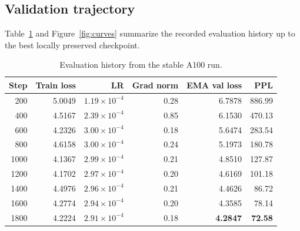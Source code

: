 \documentclass[11pt]{article}
\begin{document}
\subsection{Validation trajectory}
Table~\ref{tab:eval-history} and Figure~\ref{fig:curves} summarize the recorded evaluation history up to the best locally preserved checkpoint.

\begin{table}[t]
    \centering
    \caption{Evaluation history from the stable A100 run.}
    \label{tab:eval-history}
    \begin{tabular}{@{}r r r r r r@{}}
        \toprule
        Step & Train loss & LR & Grad norm & EMA val loss & PPL \\
        \midrule
         200 & 5.0049 & $1.19{\times}10^{-4}$ & 0.28 & 6.7878 & 886.99 \\
         400 & 4.5167 & $2.39{\times}10^{-4}$ & 0.85 & 6.1530 & 470.13 \\
         600 & 4.2326 & $3.00{\times}10^{-4}$ & 0.18 & 5.6474 & 283.54 \\
         800 & 4.6158 & $3.00{\times}10^{-4}$ & 0.24 & 5.1973 & 180.78 \\
        1000 & 4.1367 & $2.99{\times}10^{-4}$ & 0.21 & 4.8510 & 127.87 \\
        1200 & 4.1702 & $2.97{\times}10^{-4}$ & 0.20 & 4.6169 & 101.18 \\
        1400 & 4.4976 & $2.96{\times}10^{-4}$ & 0.21 & 4.4626 & 86.72 \\
        1600 & 4.2774 & $2.94{\times}10^{-4}$ & 0.20 & 4.3585 & 78.14 \\
        1800 & 4.2224 & $2.91{\times}10^{-4}$ & 0.18 & \textbf{4.2847} & \textbf{72.58} \\
        \bottomrule
    \end{tabular}
\end{table}
\end{document}
